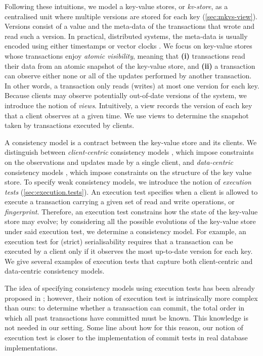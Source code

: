 Following these intuitions, we model a key-value stores, or \emph{kv-store}, as a centralised unit where multiple versions 
are stored for each key (\cref{sec:mkvs-view}). Versions consist of a value and the meta-data of the transactions that wrote and 
read such a version. In practical, distributed systems, the meta-data is usually encoded using either timestamps 
\cite{physicsnmsi,clockSI} or vector clocks \cite{gdur}. We focus on key-value stores whose transactions 
enjoy \emph{atomic visibility}, meaning that \textbf{(i)} transactions read their data from an atomic 
snapshot of the key-value store, and \textbf{(ii)} a transaction can observe either none or all 
of the updates performed by another transaction. In other words, a transaction only reads (writes) at most 
one version for each key.
Because clients may observe potentially out-of-date versions of the system, we introduce the notion of \emph{views}. 
Intuitively, a view records the version of each key that a client observes at a given time. We use views 
to determine the snapshot taken by transactions executed by clients.

A consistency model is a contract between the key-value store and its clients. We distinguish 
between \emph{client-centric} consistency models \cite{terry1994session}, 
which impose constraints on the observations and updates made by a single client, 
and \emph{data-centric} consistency models \cite{framework-concur}, which impose constraints 
on the structure of the key value store.
To specify weak consistency models, 
we introduce the notion of \emph{execution tests} (\cref{sec:execution.tests}). An execution test
 specifies when a client is allowed to execute a transaction carrying a given 
set of read and write operations, or \emph{fingerprint}. Therefore, an execution 
test constrains how the state of the key-value store may evolve;
by considering all the possible evolutions of the key-value store under said execution test, 
we determine a consistency model. For example, an execution test for (strict) serialisability 
requires that a transaction can be executed by a client only if it observes the most up-to-date 
version for each key. 
We give several examples of execution tests that capture both client-centric and 
data-centric consistency models. 

The idea of specifying consistency models using execution tests has been 
already proposed in \cite{seebelieve}; however, their notion of execution 
test is intrinsically more complex than ours: to determine 
whether a transaction can commit, the total order in which all past transactions 
have committed must be known. This knowledge is not needed in our setting.
\ac{Some line about how for this reason, our notion of execution test is closer 
to the implementation of commit tests in real database implementations.}

